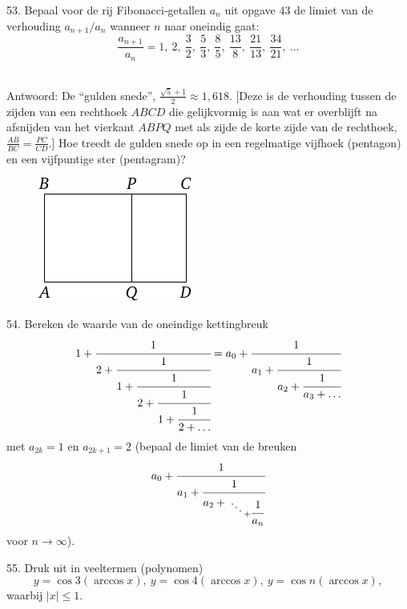\clearpage

\begin{problem}{53.}
	Bepaal voor de rij Fibonacci-getallen $a_n$ uit opgave 43 de limiet van de verhouding $a_{n+1}/a_n$ wanneer $n$ naar oneindig gaat:
	\begin{equation*}
		\frac{a_{n+1}}{a_n} = 1, \ 2, \ \frac{3}{2}, \ \frac{5}{3}, \ \frac{8}{5}, \ \frac{13}{8}, \ \frac{21}{13}, \ \frac{34}{21}, \ ...
	\end{equation*}
\\
	\begin{note}{Antwoord:}
		De \enquote{gulden snede}, $\frac{\sqrt{5}+1}{2} \approx 1{,}618$. [Deze is de verhouding tussen de zijden van een rechthoek $ABCD$ die gelijkvormig is aan wat er overblijft na afsnijden van het vierkant $ABPQ$ met als zijde de korte zijde van de rechthoek, $\frac{AB}{BC}=\frac{PC}{CD}$.] Hoe treedt de gulden snede op in een regelmatige vijfhoek (pentagon) en een vijfpuntige ster (pentagram)?
	\end{note}

	\begin{figure}
		\includegraphics{resources/taskbook-37}
	\end{figure}
\end{problem}

\begin{problem}{54.}
	Bereken de waarde van de oneindige kettingbreuk
	\begin{equation*}
		1+\cfrac{1}{2+\cfrac{1}{1+\cfrac{1}{2+\cfrac{1}{1+\cfrac{1}{2+\ldots}}}}}=
		a_0+\cfrac{1}{a_1+\cfrac{1}{a_2+\cfrac{1}{a_3+\dots}}}
	\end{equation*}
	met $a_{2k}=1$ en $a_{2k+1}=2$ (bepaal de limiet van de breuken
	\begin{equation*}
		a_0+\cfrac{1}{a_1+\cfrac{1}{a_2+{\atop{\ddots \atop {}}+\cfrac{1}{a_n}}}}
	\end{equation*}
	voor $n \to \infty$).
\end{problem}

\begin{problem}{55.}
	Druk uit in veeltermen (polynomen)
	\begin{equation*}
		y=\cos 3 (\arccos x),\ y=\cos 4 (\arccos x),\ y=\cos n (\arccos x),
	\end{equation*}
	waarbij $|x| \leqslant 1$.
\end{problem}

